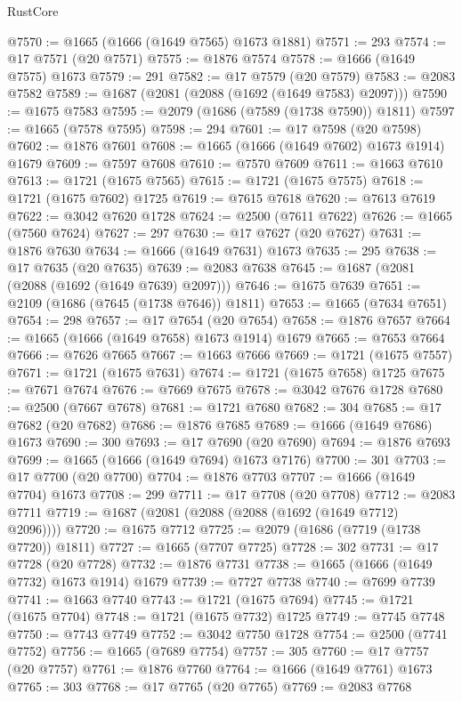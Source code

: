 \begin{lexlean}{RustCore}
\begin{coremodule}
@7570 := @1665 (@1666 (@1649 @7565) @1673 @1881)
@7571 := 293
@7574 := @17 @7571 (@20 @7571)
@7575 := @1876 @7574
@7578 := @1666 (@1649 @7575) @1673
@7579 := 291
@7582 := @17 @7579 (@20 @7579)
@7583 := @2083 @7582
@7589 := @1687 (@2081 (@2088 (@1692 (@1649 @7583) @2097)))
@7590 := @1675 @7583
@7595 := @2079 (@1686 (@7589 (@1738 @7590)) @1811)
@7597 := @1665 (@7578 @7595)
@7598 := 294
@7601 := @17 @7598 (@20 @7598)
@7602 := @1876 @7601
@7608 := @1665 (@1666 (@1649 @7602) @1673 @1914) @1679
@7609 := @7597 @7608
@7610 := @7570 @7609
@7611 := @1663 @7610
@7613 := @1721 (@1675 @7565)
@7615 := @1721 (@1675 @7575)
@7618 := @1721 (@1675 @7602) @1725
@7619 := @7615 @7618
@7620 := @7613 @7619
@7622 := @3042 @7620 @1728
@7624 := @2500 (@7611 @7622)
@7626 := @1665 (@7560 @7624)
@7627 := 297
@7630 := @17 @7627 (@20 @7627)
@7631 := @1876 @7630
@7634 := @1666 (@1649 @7631) @1673
@7635 := 295
@7638 := @17 @7635 (@20 @7635)
@7639 := @2083 @7638
@7645 := @1687 (@2081 (@2088 (@1692 (@1649 @7639) @2097)))
@7646 := @1675 @7639
@7651 := @2109 (@1686 (@7645 (@1738 @7646)) @1811)
@7653 := @1665 (@7634 @7651)
@7654 := 298
@7657 := @17 @7654 (@20 @7654)
@7658 := @1876 @7657
@7664 := @1665 (@1666 (@1649 @7658) @1673 @1914) @1679
@7665 := @7653 @7664
@7666 := @7626 @7665
@7667 := @1663 @7666
@7669 := @1721 (@1675 @7557)
@7671 := @1721 (@1675 @7631)
@7674 := @1721 (@1675 @7658) @1725
@7675 := @7671 @7674
@7676 := @7669 @7675
@7678 := @3042 @7676 @1728
@7680 := @2500 (@7667 @7678)
@7681 := @1721 @7680
@7682 := 304
@7685 := @17 @7682 (@20 @7682)
@7686 := @1876 @7685
@7689 := @1666 (@1649 @7686) @1673
@7690 := 300
@7693 := @17 @7690 (@20 @7690)
@7694 := @1876 @7693
@7699 := @1665 (@1666 (@1649 @7694) @1673 @7176)
@7700 := 301
@7703 := @17 @7700 (@20 @7700)
@7704 := @1876 @7703
@7707 := @1666 (@1649 @7704) @1673
@7708 := 299
@7711 := @17 @7708 (@20 @7708)
@7712 := @2083 @7711
@7719 := @1687 (@2081 (@2088 (@2088 (@1692 (@1649 @7712) @2096))))
@7720 := @1675 @7712
@7725 := @2079 (@1686 (@7719 (@1738 @7720)) @1811)
@7727 := @1665 (@7707 @7725)
@7728 := 302
@7731 := @17 @7728 (@20 @7728)
@7732 := @1876 @7731
@7738 := @1665 (@1666 (@1649 @7732) @1673 @1914) @1679
@7739 := @7727 @7738
@7740 := @7699 @7739
@7741 := @1663 @7740
@7743 := @1721 (@1675 @7694)
@7745 := @1721 (@1675 @7704)
@7748 := @1721 (@1675 @7732) @1725
@7749 := @7745 @7748
@7750 := @7743 @7749
@7752 := @3042 @7750 @1728
@7754 := @2500 (@7741 @7752)
@7756 := @1665 (@7689 @7754)
@7757 := 305
@7760 := @17 @7757 (@20 @7757)
@7761 := @1876 @7760
@7764 := @1666 (@1649 @7761) @1673
@7765 := 303
@7768 := @17 @7765 (@20 @7765)
@7769 := @2083 @7768

\end{coremodule}
\end{lexlean}
